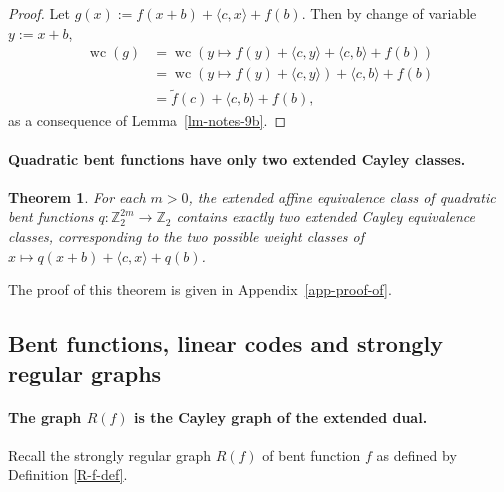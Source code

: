 \documentclass[12pt,a4paper]{article}
\newcommand{\mb}[1]{\mathbb{#1}}
\newcommand{\Z}{\mb{Z}}
\newcommand{\To}{\rightarrow}
\newcommand{\dual}[1]{\widetilde{#1}}
\newcommand{\weightclass}[1]{\operatorname{wc}\left(#1\right)}
\newtheorem{Theorem}{Theorem}
\begin{document}
\begin{proof}
Let $g(x) := f(x+b) + \langle c, x \rangle + f(b)$.
Then by change of variable $y:=x+b$,
\begin{align*}
\weightclass{g}
&=
\weightclass{y \mapsto f(y) + \langle c, y \rangle + \langle c, b \rangle + f(b)}
\\
&=
\weightclass{y \mapsto f(y) + \langle c, y \rangle} + \langle c, b \rangle + f(b)
\\
&=
\dual{f}(c) + \langle c, b \rangle + f(b),
\end{align*}
as a consequence of Lemma~\ref{lm-notes-9b}.
\end{proof}


\paragraph*{Quadratic bent functions have only two extended Cayley classes.}
\begin{Theorem}
\label{th-Quadratic-Classes}
For each $m>0$, the extended affine equivalence class of quadratic bent functions
$q : \Z_2^{2m} \To \Z_2$ contains exactly two extended Cayley equivalence classes,
corresponding to the two possible weight classes of
$x \mapsto q(x+b) + \langle c, x \rangle + q(b)$.
\end{Theorem}

The proof of this theorem is given in Appendix~\ref{app-proof-of}.

\subsection{Bent functions, linear codes and strongly regular graphs}
\paragraph*{The graph $R(f)$ is the Cayley graph of the extended dual.}
Recall the strongly regular graph $R(f)$ of bent function $f$ as defined by Definition
\ref{R-f-def}.
\end{document}

